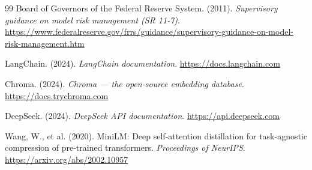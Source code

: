 \documentclass[12pt,a4paper]{report}
\begin{document}
\begin{thebibliography}{99}
Board of Governors of the Federal Reserve System. (2011). \textit{Supervisory guidance on model risk management (SR 11-7)}. \url{https://www.federalreserve.gov/frrs/guidance/supervisory-guidance-on-model-risk-management.htm}

LangChain. (2024). \textit{LangChain documentation}. \url{https://docs.langchain.com}

Chroma. (2024). \textit{Chroma --- the open-source embedding database}. \url{https://docs.trychroma.com}

DeepSeek. (2024). \textit{DeepSeek API documentation}. \url{https://api.deepseek.com}

Wang, W., et al. (2020). MiniLM: Deep self-attention distillation for task-agnostic compression of pre-trained transformers. \textit{Proceedings of NeurIPS}. \url{https://arxiv.org/abs/2002.10957}

\end{thebibliography}
\end{document}
